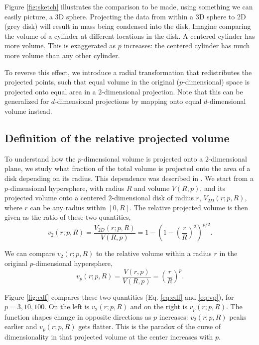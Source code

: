\documentclass[]{interact}
\theoremstyle{plain}%
\theoremstyle{definition}
\theoremstyle{remark}
\begin{document}
Figure \ref{fig:sketch} illustrates the comparison to be made, using
something we can easily picture, a 3D sphere. Projecting the data from
within a 3D sphere to 2D (grey disk) will result in mass being condensed
into the disk. Imagine comparing the volume of a cylinder at different
locations in the disk. A centered cylinder has more volume. This is
exaggerated as \(p\) increases: the centered cylinder has much more
volume than any other cylinder.

To reverse this effect, we introduce a radial transformation that
redistributes the projected points, such that equal volume in the
original (\(p\)-dimensional) space is projected onto equal area in a
2-dimensional projection. Note that this can be generalized for
\(d\)-dimensional projections by mapping onto equal \(d\)-dimensional
volume instead.

\hypertarget{definition-of-the-relative-projected-volume}{%
\subsection{Definition of the relative projected
volume}\label{definition-of-the-relative-projected-volume}}

To understand how the \(p\)-dimensional volume is projected onto a
\(2\)-dimensional plane, we study what fraction of the total volume is
projected onto the area of a disk depending on its radius. This
dependence was described in \citet{Laa:2020wkm}. We start from a
\(p\)-dimensional hypersphere, with radius \(R\) and volume \(V(R, p)\),
and its projected volume onto a centered \(2\)-dimensional disk of
radius \(r\), \(V_{2D}(r; p, R)\), where \(r\) can be any radius within
\([0, R]\). The relative projected volume is then given as the ratio of
these two quantities, \begin{equation}
v_{2} (r; p, R) = \frac{V_{2D}(r; p, R)}{V(R, p)} = 1 - \left(1-\left(\frac{r}{R}\right)^2\right)^{p/2}.
\label{eq:cdf}
\end{equation}

We can compare \(v_{2} (r; p, R)\) to the relative volume within a
radius \(r\) in the original \(p\)-dimensional hypersphere,
\begin{equation}
v_{p} (r; p, R) = \frac{V(r, p)}{V(R, p)} = \left({\frac{r}{R}}\right)^p.
\label{eq:vp}
\end{equation}

Figure \ref{fig:cdf} compares these two quantities (Eq. \ref{eq:cdf} and
\ref{eq:vp}), for \(p=3, 10, 100\). On the left is \(v_{2} (r; p, R)\)
and on the right is \(v_{p} (r; p, R)\). The function shapes change in
opposite directions as \(p\) increases: \(v_{2} (r; p, R)\) peaks
earlier and \(v_{p} (r; p, R)\) gets flatter. This is the paradox of the
curse of dimensionality in that projected volume at the center increases
with \(p\).
\end{document}
